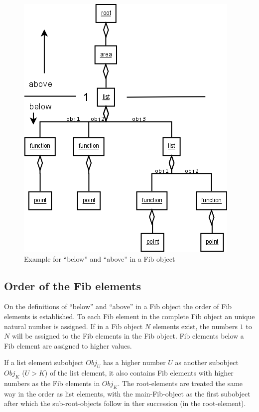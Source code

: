 \begin{figure}[htbp]
\begin{center}
  \includegraphics[scale=0.5]{above_below}
\end{center}
\caption{Example for ``below'' and ``above'' in a Fib object}
\label{figDirectionFibElements}
\end{figure}


\subsection{Order of the Fib elements}
\label{secOrderFibElements}

On the definitions of ``below'' and ``above'' in a Fib object the order of Fib elements is established. To each Fib element in the complete Fib object an unique natural number is assigned. If in a Fib object $N$ elements exist, the numbers $1$ to $N$ will be assigned to the Fib elements in the Fib object. Fib elements below a Fib element are assigned to higher values.

If a list element subobject $Obj_U$ has a higher number $U$ as another subobject $Obj_K$ ($U>K$) of the list element, it also contains Fib elements with higher numbers as the Fib elements in $Obj_K$. The root-elements are treated the same way in the order as list elements, with the main-Fib-object as the first subobject after which the sub-root-objects follow in ther succession (in the root-element).

